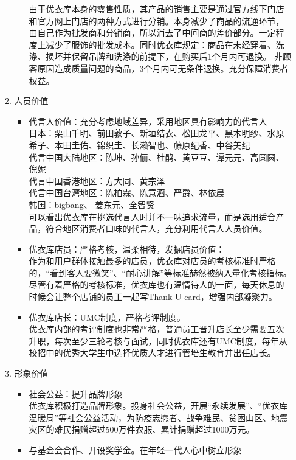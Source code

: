 \documentclass{xjtureport}
\begin{document}
\begin{enumerate}
\begin{enumerate}
\begin{itemize}
        由于优衣库本身的零售性质，其产品的销售主要是通过官方线下门店和官方网上门店的两种方式进行分销。本身减少了商品的流通环节，由自己作为批发商和分销商，所以消去了中间商的差价部分。一定程度上减少了服饰的批发成本。同时优衣库规定：商品在未经穿着、洗涤、损坏并保留吊牌和洗涤的前提下，在购买后1个月内可退换。 非顾客原因造成质量问题的商品，3个月内可无条件退换。\cite{ref8}充分保障消费者权益。
    \end{itemize}
    \item 人员价值
    \begin{itemize}
        \item 代言人价值：充分考虑地域差异，采用地区具有影响力的代言人\\
        日本：栗山千明、前田敦子、新垣结衣、松田龙平、黑木明纱、水原希子、本田圭佑、锦织圭、长濑智也、藤原纪香、中谷美纪\\
        代言中国大陆地区：陈坤、孙俪、杜鹃、黄豆豆、谭元元、高圆圆、倪妮\\代言中国香港地区：方大同、黄宗泽\\代言中国台湾地区：陈柏霖、陈意涵、严爵、林依晨\\韩国：bigbang、 姜东元、全智贤\\可以看出优衣库在挑选代言人时并不一味追求流量，而是选用适合产品，符合地区消费者口味的代言人，充分利用代言人人员价值。
        \item 优衣库店员：严格考核，温柔相待，发掘店员价值：\\
        作为和用户群体接触最多的店员，优衣库对店员的考核标准时严格的，“看到客人要微笑”、“耐心讲解”等标准赫然被纳入量化考核指标。尽管有着严格的考核标准，优衣库也有温情待人的一面，每天休息的时候会让整个店铺的员工一起写Thank U card，增强内部凝聚力。
        \item 优衣库店长：UMC制度，严格考评制度。\\
        优衣库内部的考评制度也非常严格，普通员工晋升店长至少需要五次升职，每次至少三轮考核与面试，同时优衣库还有UMC制度，每年从校招中的优秀大学生中选择优质人才进行管培生教育并出任店长。
    \end{itemize}
    \item 形象价值
    \begin{itemize}
        \item 社会公益：提升品牌形象\\优衣库积极打造品牌形象。投身社会公益，开展“永续发展”、“优衣库温暖周”等社会公益活动，为防疫志愿者\cite{ref10}、战争难民、贫困山区、地震灾区的难民捐赠超过500万件衣服、累计捐赠超过1000万元。
        \item 与基金会合作、开设奖学金\cite{ref4}。在年轻一代人心中树立形象\\

\end{itemize}
\end{enumerate}
\end{enumerate}
\end{document}
